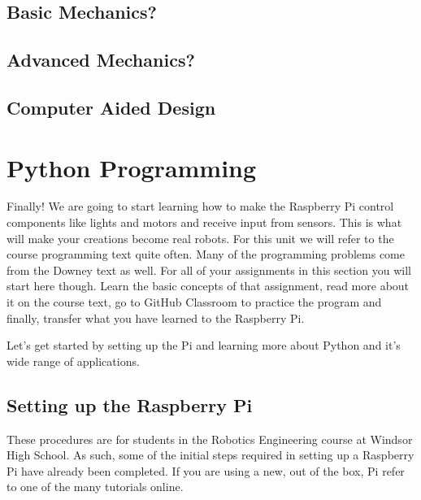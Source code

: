 \documentclass[
]{book}
\begin{document}
\hypertarget{basic-mechanics}{%
\section{Basic Mechanics?}\label{basic-mechanics}}

\hypertarget{advanced-mechanics}{%
\section{Advanced Mechanics?}\label{advanced-mechanics}}

\hypertarget{computer-aided-design}{%
\section{Computer Aided Design}\label{computer-aided-design}}

\hypertarget{python-programming}{%
\chapter{Python Programming}\label{python-programming}}

Finally! We are going to start learning how to make the Raspberry Pi control components like lights and motors and receive input from sensors. This is what will make your creations become real robots. For this unit we will refer to the course programming text quite often. Many of the programming problems come from the Downey text as well. For all of your assignments in this section you will start here though. Learn the basic concepts of that assignment, read more about it on the course text, go to GitHub Classroom to practice the program and finally, transfer what you have learned to the Raspberry Pi.

Let's get started by setting up the Pi and learning more about Python and it's wide range of applications.

\hypertarget{setting-up-the-raspberry-pi}{%
\section{Setting up the Raspberry Pi}\label{setting-up-the-raspberry-pi}}

These procedures are for students in the Robotics Engineering course at Windsor High School. As such, some of the initial steps required in setting up a Raspberry Pi have already been completed. If you are using a new, out of the box, Pi refer to one of the many tutorials online.
\end{document}
